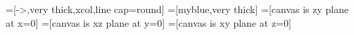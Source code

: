 \contourlength{1.0pt}

\tikzset{>=latex} %
=[->,very thick,xcol,line cap=round]
=[myblue,very thick]
=[canvas is zy plane at x=0]
=[canvas is xz plane at y=0]
=[canvas is xy plane at z=0]
\def\tick#1#2{\draw[thick] (#1) ++ (#2:0.12) --++ (#2-180:0.24)}
\def\N{100}





\def\xang{-13}
\def\zang{45}


